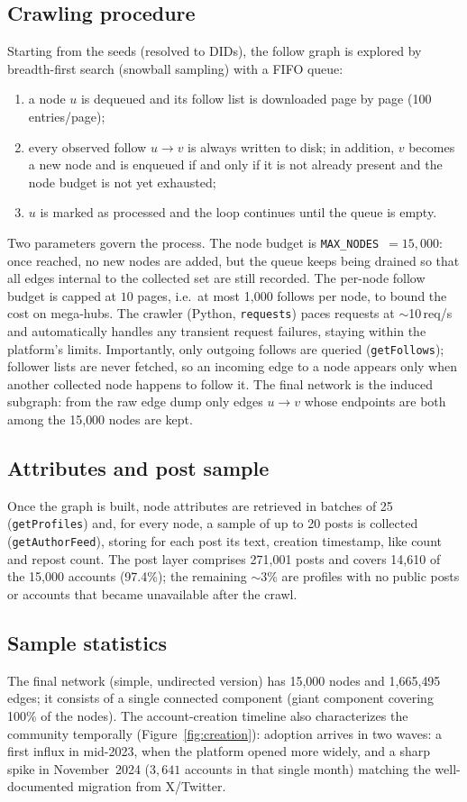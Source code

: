 \subsection{Crawling procedure}
Starting from the seeds (resolved to DIDs), the follow graph is explored by breadth-first search (snowball sampling) with a FIFO queue:
\begin{enumerate}\itemsep0pt
  \item a node $u$ is dequeued and its follow list is downloaded page by page (100 entries/page);
  \item every observed follow $u\!\to\!v$ is always written to disk; in addition, $v$ becomes a new node and is enqueued if and only if it is not already present and the node budget is not yet exhausted;
  \item $u$ is marked as processed and the loop continues until the queue is empty.
\end{enumerate}
Two parameters govern the process. The node budget is \texttt{MAX\_NODES}~$=15{,}000$: once reached, no new nodes are added, but the queue keeps being drained so that all edges internal to the collected set are still recorded. The per-node follow budget is capped at $10$ pages, i.e.\ at most 1{,}000 follows per node, to bound the cost on mega-hubs. The crawler (Python, \texttt{requests}) paces requests at $\sim$10\,req/s and automatically handles any transient request failures, staying within the platform's limits. Importantly, only outgoing follows are queried (\texttt{getFollows}); follower lists are never fetched, so an incoming edge to a node appears only when another collected node happens to follow it. The final network is the induced subgraph: from the raw edge dump only edges $u\!\to\!v$ whose endpoints are both among the 15{,}000 nodes are kept.

\subsection{Attributes and post sample}
Once the graph is built, node attributes are retrieved in batches of 25 (\texttt{getProfiles}) and, for every node, a sample of up to 20 posts is collected (\texttt{getAuthorFeed}), storing for each post its text, creation timestamp, like count and repost count. The post layer comprises 271{,}001 posts and covers 14{,}610 of the 15{,}000 accounts (97.4\%); the remaining $\sim$3\% are profiles with no public posts or accounts that became unavailable after the crawl.

\subsection{Sample statistics}
The final network (simple, undirected version) has 15{,}000 nodes and 1{,}665{,}495 edges; it consists of a single connected component (giant component covering 100\% of the nodes). The account-creation timeline also characterizes the community temporally (Figure~\ref{fig:creation}): adoption arrives in two waves: a first influx in mid-2023, when the platform opened more widely, and a sharp spike in November~2024 ($3{,}641$ accounts in that single month) matching the well-documented migration from X/Twitter.

